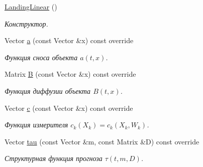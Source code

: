 \begin{DoxyCompactItemize}
\item 
\hypertarget{class_tasks_1_1_continuous_discrete_1_1_landing_linear_ad474504f9db87de67ebd0d5fb44f35c2}{}\label{class_tasks_1_1_continuous_discrete_1_1_landing_linear_ad474504f9db87de67ebd0d5fb44f35c2} 
\hyperlink{class_tasks_1_1_continuous_discrete_1_1_landing_linear_ad474504f9db87de67ebd0d5fb44f35c2}{Landing\+Linear} ()
\begin{DoxyCompactList}\small\item\em Конструктор. \end{DoxyCompactList}\item 
\hypertarget{class_tasks_1_1_continuous_discrete_1_1_landing_linear_a8cd42e44fb7b1aec6e972230d50d23c3}{}\label{class_tasks_1_1_continuous_discrete_1_1_landing_linear_a8cd42e44fb7b1aec6e972230d50d23c3} 
Vector \hyperlink{class_tasks_1_1_continuous_discrete_1_1_landing_linear_a8cd42e44fb7b1aec6e972230d50d23c3}{a} (const Vector \&x) const override
\begin{DoxyCompactList}\small\item\em Функция сноса объекта $a(t,x)$. \end{DoxyCompactList}\item 
\hypertarget{class_tasks_1_1_continuous_discrete_1_1_landing_linear_a84cc48724e8d220d6c22c5750a2397d1}{}\label{class_tasks_1_1_continuous_discrete_1_1_landing_linear_a84cc48724e8d220d6c22c5750a2397d1} 
Matrix \hyperlink{class_tasks_1_1_continuous_discrete_1_1_landing_linear_a84cc48724e8d220d6c22c5750a2397d1}{B} (const Vector \&x) const override
\begin{DoxyCompactList}\small\item\em Функция диффузии объекта $B(t,x)$. \end{DoxyCompactList}\item 
Vector \hyperlink{class_tasks_1_1_continuous_discrete_1_1_landing_linear_aa3bddd1de01a202030bbccc1994e10af}{c} (const Vector \&x) const override
\begin{DoxyCompactList}\small\item\em Функция измерителя $c_k(X_k) = c_k(X_k, W_k)$. \end{DoxyCompactList}\item 
Vector \hyperlink{class_tasks_1_1_continuous_discrete_1_1_landing_linear_a1ee11cced65180b2a055b8ca848ef4e0}{tau} (const Vector \&m, const Matrix \&D) const override
\begin{DoxyCompactList}\small\item\em Структурная функция прогноза $\tau(t, m, D)$. \end{DoxyCompactList}\item 

\end{DoxyCompactItemize}
